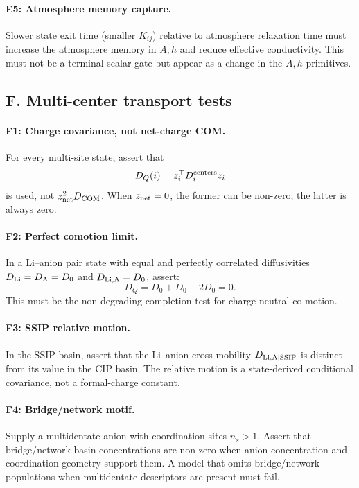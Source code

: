 \documentclass[11pt]{article}
\begin{document}
\paragraph{E5: Atmosphere memory capture.}
Slower state exit time (smaller \(K_{ij}\)) relative to atmosphere relaxation
time must increase the atmosphere memory in \(A,h\) and reduce effective
conductivity. This must not be a terminal scalar gate but appear as a
change in the \(A,h\) primitives.

\subsection{F. Multi-center transport tests}

\paragraph{F1: Charge covariance, not net-charge COM.}
For every multi-site state, assert that
\[
D_Q(i) = z_i^\top D_i^{\rm centers} z_i
\]
is used, not \(z_{\rm net}^2 D_{\rm COM}\).
When \(z_{\rm net}=0\), the former can be non-zero; the latter is always zero.

\paragraph{F2: Perfect comotion limit.}
In a Li--anion pair state with equal and perfectly correlated diffusivities
\(D_{\rm Li}=D_{\rm A}=D_0\) and \(D_{\rm Li,A}=D_0\), assert:
\[
D_Q = D_0+D_0-2D_0=0.
\]
This must be the non-degrading completion test for charge-neutral co-motion.

\paragraph{F3: SSIP relative motion.}
In the SSIP basin, assert that the Li--anion cross-mobility
\(D_{\rm Li,A|\text{SSIP}}\) is distinct from its value in the CIP basin.
The relative motion is a state-derived conditional covariance, not a
formal-charge constant.

\paragraph{F4: Bridge/network motif.}
Supply a multidentate anion with coordination sites \(n_s>1\). Assert that
bridge/network basin concentrations are non-zero when anion concentration
and coordination geometry support them. A model that omits bridge/network
populations when multidentate descriptors are present must fail.
\end{document}
